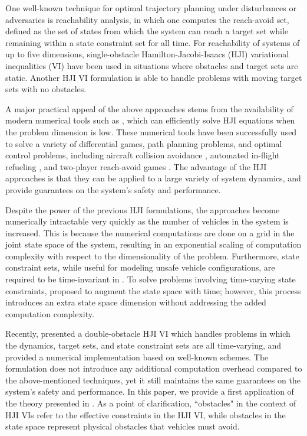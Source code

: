 One well-known technique for optimal trajectory planning under disturbances or adversaries is reachability analysis, in which one computes the reach-avoid set, defined as the set of states from which the system can reach a target set while remaining within a state constraint set for all time. For reachability of systems of up to five dimensions, single-obstacle Hamilton-Jacobi-Isaacs (HJI) variational inequalities (VI) \cite{mitchell05,bokanowski10} have been used in situations where obstacles and target sets are static. Another HJI VI formulation \cite{barron89} is able to handle problems with moving target sets with no obstacles. 

A major practical appeal of the above approaches stems from the availability of modern numerical tools such as \cite{mitchell05, sethian96, osher02, LSToolbox}, which can efficiently solve HJI equations when the problem dimension is low. These numerical tools have been successfully used to solve a variety of differential games, path planning problems, and optimal control problems, including aircraft collision avoidance \cite{mitchell05}, automated in-flight refueling \cite{ding08}, and two-player reach-avoid games \cite{huang11}. The advantage of the HJI approaches is that they can be applied to a large variety of system dynamics, and provide guarantees on the system's safety and performance.

Despite the power of the previous HJI formulations, the approaches become numerically intractable very quickly as the number of vehicles in the system is increased. This is because the numerical computations are done on a grid in the joint state space of the system, resulting in an exponential scaling of computation complexity with respect to the dimensionality of the problem. Furthermore, state constraint sets, while useful for modeling unsafe vehicle configurations, are required to be time-invariant in \cite{mitchell05, bokanowski10, mitchell-thesis}. To solve problems involving time-varying state constraints, \cite{bokanowski11} proposed to augment the state space with time; however, this process introduces an extra state space dimension without addressing the added computation complexity.

Recently, \cite{fisac15} presented a double-obstacle HJI VI which handles problems in which the dynamics, target sets, and state constraint sets are all time-varying, and provided a numerical implementation based on well-known schemes. The formulation does not introduce any additional computation overhead compared to the above-mentioned techniques, yet it still maintains the same guarantees on the system's safety and performance. In this paper, we provide a first application of the theory presented in \cite{fisac15}. As a point of clarification, ``obstacles" in the context of HJI VIs refer to the effective constraints in the HJI VI, while obstacles in the state space represent physical obstacles that vehicles must avoid.

